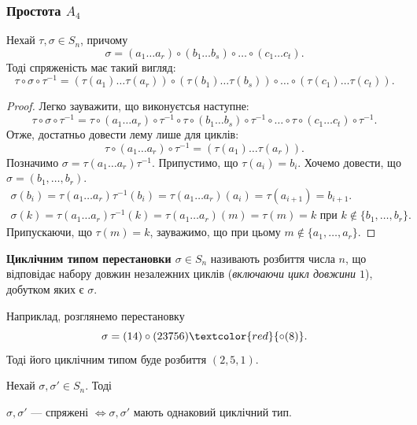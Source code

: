 \documentclass{math_library}
\begin{document}
\subsubsection{Простота $A_4$}
\begin{lemma}[Спряженість в $S_n$]
Нехай $\tau,\sigma \in S_n$, причому
\[
\sigma = (a_1 \dots a_r) \circ (b_1 \dots b_s) \circ \dots \circ (c_1 \dots c_t).
\]
Тоді спряженість має такий вигляд:
\[
\tau \circ \sigma \circ \tau^{-1} = (\tau(a_1)\dots \tau(a_r)) \circ (\tau(b_1)\dots \tau(b_s)) \circ \dots \circ (\tau(c_1)\dots \tau(c_t)).
\]
\end{lemma}

\begin{proof}
Легко зауважити, що виконуєтсья наступне:
\[
\tau \circ \sigma \circ \tau^{-1} = \tau \circ (a_1 \dots a_r) \circ \tau^{-1} \circ \tau \circ (b_1 \dots b_s) \circ \tau^{-1} \circ \dots \circ \tau \circ (c_1 \dots c_t) \circ \tau^{-1}.
\]
Отже, достатньо довести лему лише для циклів:\\
\[
\tau \circ (a_1 \dots a_r) \circ \tau^{-1} = (\tau(a_1) \dots \tau(a_r)).
\]
Позначимо $\sigma = \tau (a_1 \dots a_r) \tau^{-1}$. Припустимо, що $\tau(a_i) = b_i$. Хочемо довести, що $\sigma = (b_1,\dots,b_r)$.
\begin{align*}
\sigma(b_i) = \tau (a_1 \dots a_r) \tau^{-1} (b_{i}) = \tau (a_1 \dots a_r) (a_i) = \tau (a_{i+1}) = b_{i+1}. \\
\sigma(k) = \tau (a_1 \dots a_r) \tau^{-1}(k) = \tau (a_1 \dots a_r) (m) = \tau (m) = k \text{ при } k \notin \{b_1,\dots,b_r\}.
\end{align*}
Припускаючи, що $\tau(m) = k$, зауважимо, що при цьому $m \notin \{a_1,\dots,a_r\}$.
\end{proof}

\begin{definition}
\textbf{Циклічним типом перестановки $\sigma \in S_n$} називають розбиття числа $n$, що відповідає набору довжин незалежних циклів (\textit{включаючи цикл довжини $1$}), добутком яких є $\sigma$.
\end{definition}

\begin{example}
Наприклад, розглянемо перестановку
\[
\sigma = (14) \circ (23756) \textcolor{red}{\circ (8)}.
\]
Тоді його циклічним типом буде розбиття $(2,5,1)$.
\end{example}

\begin{corollary}
Нехай $\sigma, \sigma' \in S_n$. Тоді
\begin{center}
$\sigma, \sigma'$ --- спряжені $\iff \sigma, \sigma'$ мають однаковий циклічний тип.
\end{center}
\end{corollary}
\end{document}
